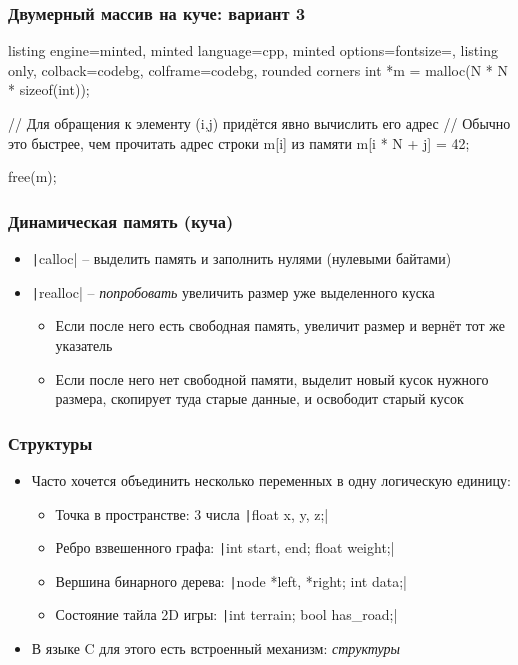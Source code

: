 \documentclass[10pt]{beamer}
\begin{document}
\begin{frame}[fragile]
\frametitle{Двумерный массив на куче: вариант 3}
\begin{tcblisting}{listing engine=minted, minted language=cpp, minted options={fontsize=\scriptsize}, listing only, colback=codebg, colframe=codebg, rounded corners}
int *m = malloc(N * N * sizeof(int));

// Для обращения к элементу (i,j) придётся явно вычислить его адрес
// Обычно это быстрее, чем прочитать адрес строки m[i] из памяти
m[i * N + j] = 42;

free(m);
\end{tcblisting}
\end{frame}

\begin{frame}[fragile]
\frametitle{Динамическая память (куча)}
\begin{itemize}
\item \texttt|calloc| -- выделить память и заполнить нулями (нулевыми байтами)
\pause
\item \texttt|realloc| -- \textit{попробовать} увеличить размер уже выделенного куска
\pause
\begin{itemize}
\item Если после него есть свободная память, увеличит размер и вернёт тот же указатель
\pause
\item Если после него нет свободной памяти, выделит новый кусок нужного размера, скопирует туда старые данные, и освободит старый кусок
\end{itemize}
\end{itemize}
\end{frame}

\begin{frame}[fragile]
\frametitle{Структуры}
\begin{itemize}
\item Часто хочется объединить несколько переменных в одну логическую единицу:
\pause
\begin{itemize}
\item Точка в пространстве: 3 числа \texttt|float x, y, z;|
\pause
\item Ребро взвешенного графа: \texttt|int start, end; float weight;|
\pause
\item Вершина бинарного дерева: \texttt|node *left, *right; int data;|
\pause
\item Состояние тайла 2D игры: \texttt|int terrain; bool has_road;|
\end{itemize}
\pause
\item В языке C для этого есть встроенный механизм: \textit{структуры}
\end{itemize}
\end{frame}
\end{document}
